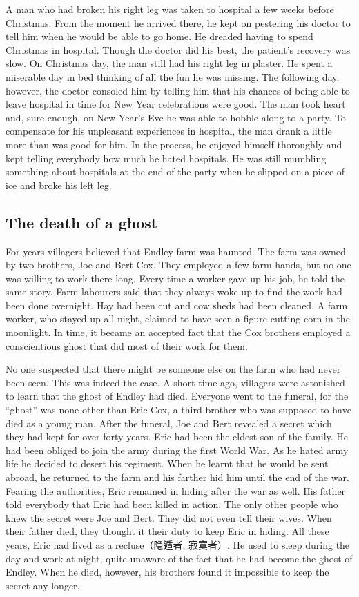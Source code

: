 \documentclass[11pt]{article}
\begin{document}
A man who had broken his right leg was taken to hospital a few weeks before Christmas. From the moment he arrived there, he kept on pestering his doctor to tell him when he would be able to go home. He dreaded having to spend Christmas in hospital. Though the doctor did his best, the patient's recovery was slow. On Christmas day, the man still had his right leg in plaster. He spent a miserable day in bed thinking of all the fun he was missing. The following day, however, the doctor consoled him by telling him that his chances of being able to leave hospital in time for New Year celebrations were good. The man took heart and, sure enough, on New Year's Eve he was able to hobble along to a party. To compensate for his unpleasant experiences in hospital, the man drank a little more than was good for him. In the process, he enjoyed himself thoroughly and kept telling everybody how much he hated hospitals. He was still mumbling something about hospitals at the end of the party when he slipped on a piece of ice and broke his left leg. 
\subsection{The death of a ghost}
\label{sec-1-30}

For years villagers believed that Endley farm was haunted. The farm was owned by two brothers, Joe and Bert Cox. They employed a few farm hands, but no one was willing to work there long. Every time a worker gave up his job, he told the same story. Farm labourers said that they always woke up to find the work had been done overnight. Hay had been cut and cow sheds had been cleaned. A farm worker, who stayed up all night, claimed to have seen a figure cutting corn in the moonlight. In time, it became an accepted fact that the Cox brothers employed a conscientious ghost that did most of their work for them.

No one suspected that there might be someone else on the farm who had never been seen. This was indeed the case. A short time ago, villagers were astonished to learn that the ghost of Endley had died. Everyone went to the funeral, for the ``ghost'' was none other than Eric Cox, a third brother who was supposed to have died as a young man. After the funeral, Joe and Bert revealed a secret which they had kept for over forty years. Eric had been the eldest son of the family. He had been obliged to join the army during the first World War. As he hated army life he decided to desert his regiment. When he learnt that he would be sent abroad, he returned to the farm and his farther hid him until the end of the war. Fearing the authorities, Eric remained in hiding after the war as well. His father told everybody that Eric had been killed in action. The only other people who knew the secret were Joe and Bert. They did not even tell their wives. When their father died, they thought it their duty to keep Eric in hiding. All these years, Eric had lived as a recluse（隐遁者, 寂寞者）. He used to sleep during the day and work at night, quite unaware of the fact that he had become the ghost of Endley. When he died, however, his brothers found it impossible to keep the secret any longer. 
\end{document}
